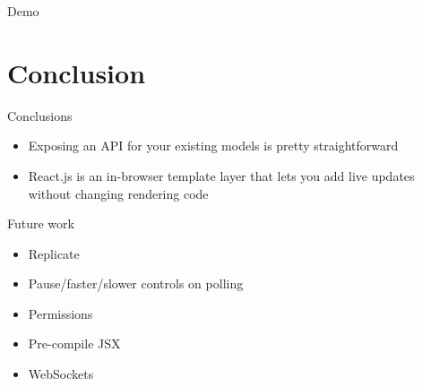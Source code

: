 \documentclass[xcolor=svgnames,17pt]{beamer}
\begin{document}
\begin{frame}{Demo}
\end{frame}

\section{Conclusion}

\begin{frame}{}
\tableofcontents[currentsection]
\end{frame}

\begin{frame}{Conclusions}
\begin{itemize}
\item Exposing an API for your existing models is pretty straightforward
\pause
\item React.js is an in-browser template layer that lets you add live
updates without changing rendering code
\end{itemize}
\end{frame}

\begin{frame}{Future work}
\begin{itemize}
\item \alert<5>{Replicate}
\pause
\item Pause/faster/slower controls on polling
\pause
\item Permissions
\pause
\item Pre-compile JSX
\pause
\item WebSockets
\end{itemize}
\end{frame}
\end{document}
